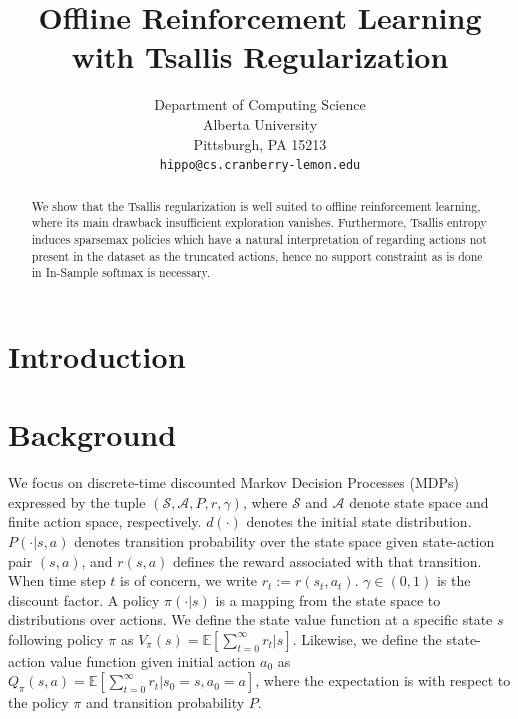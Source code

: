 \documentclass{article}
\title{Offline Reinforcement Learning with Tsallis Regularization}
\author{%
  Department of Computing Science\\
  Alberta University\\
  Pittsburgh, PA 15213 \\
  \texttt{hippo@cs.cranberry-lemon.edu} \\
}
\newcommand{\AdaRectBracket}[1]{\left[#1\right]}
\begin{document}

\maketitle

\begin{abstract}
    We show that the Tsallis regularization is well suited to offline reinforcement learning, where its main drawback insufficient exploration vanishes.
    Furthermore, Tsallis entropy induces sparsemax policies which have a natural interpretation of regarding actions not present in the dataset as the truncated actions, hence no support constraint as is done in In-Sample softmax is necessary.
\end{abstract}


\section{Introduction}





\section{Background}


We focus on discrete-time discounted Markov Decision Processes (MDPs) expressed by the tuple $(\mathcal{S}, \mathcal{A}, P,  r,  \gamma)$, where $\mathcal{S}$ and $\mathcal{A}$ denote state space and finite action space, respectively. 
$d(\cdot)$ denotes the initial state distribution.
$P(\cdot |s,a)$ denotes transition probability over the state space given state-action pair $(s,a)$,  
and $r(s,a)$ defines the reward associated with that transition. 
When time step $t$ is of concern, we write $r_t := r(s_t, a_t)$.
$\gamma \in (0,1)$ is the discount factor.
A policy $\pi(\cdot|s)$ is a mapping from the state space to distributions over actions.
We define the state value function at a specific state $s$ following policy $\pi$  as  $V_{\pi}(s) = \mathbb{E}\AdaRectBracket{\sum_{t=0}^{\infty} r_t | s }$.
Likewise, we define the state-action value function given initial action $a_0$ as  $Q_{\pi}(s,a) = \mathbb{E}\AdaRectBracket{\sum_{t=0}^{\infty} r_t | s_0=s, a_0 = a }$,
where the expectation is with respect to the policy $\pi$ and transition probability $P$.
\end{document}
